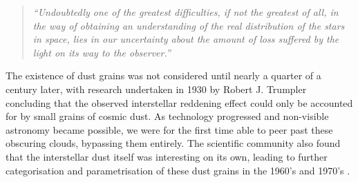 \begin{quote}
  \textit{
    ``Undoubtedly one of the greatest difficulties, if not the greatest of all, in the way of obtaining an understanding of the real distribution of the stars in space, lies in our uncertainty about the amount of loss suffered by the light on its way to the observer.''
  }
\end{quote}

\noindent
The existence of dust grains was not considered until nearly a quarter of a century later, with research undertaken in 1930 by Robert J. Trumpler concluding that the observed interstellar reddening effect could only be accounted for by small grains of cosmic dust.
As technology progressed and non-visible astronomy became possible, we were for the first time able to peer past these obscuring clouds, bypassing them entirely.
The scientific community also found that the interstellar dust itself was interesting on its own, leading to further categorisation and parametrisation of these dust grains in the 1960's and 1970's
\parencite[4-13]{whittetDustGalacticEnvironment2002}.

